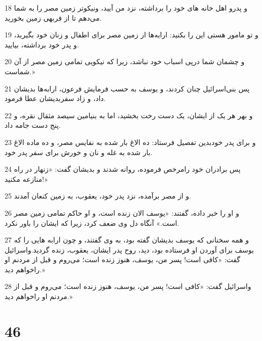 \par 18 و پدرو اهل خانه های خود را برداشته، نزد من آیید، ونیکوتر زمین مصر را به شما می‌دهم تا از فربهی زمین بخورید.
\par 19 و تو مامور هستی این را بکنید: ارابه‌ها از زمین مصر برای اطفال و زنان خود بگیرید، و پدر خود برداشته، بیایید.
\par 20 و چشمان شما در‌پی اسباب خود نباشد، زیرا که نیکویی تمامی زمین مصر از آن شماست.»
\par 21 پس بنی‌اسرائیل چنان کردند، و یوسف به حسب فرمایش فرعون، ارابه‌ها بدیشان داد، و زاد سفربدیشان عطا فرمود.
\par 22 و بهر هر یک از ایشان، یک دست رخت بخشید، اما به بنیامین سیصد مثقال نقره، و پنج دست جامه داد.
\par 23 و برای پدر خودبدین تفصیل فرستاد: ده الاغ بار شده به نفایس مصر، و ده ماده الاغ بار شده به غله و نان و خورش برای سفر پدر خود.
\par 24 پس برادران خود رامرخص فرموده، روانه شدند و بدیشان گفت: «زنهار در راه منازعه مکنید!»
\par 25 و از مصر برآمده، نزد پدر خود، یعقوب، به زمین کنعان آمدند.
\par 26 و او را خبر داده، گفتند: «یوسف الان زنده است، و او حاکم تمامی زمین مصر است.» آنگاه دل وی ضعف کرد، زیرا که ایشان را باور نکرد.
\par 27 و همه سخنانی که یوسف بدیشان گفته بود، به وی گفتند، و چون ارابه هایی را که یوسف برای آوردن او فرستاده بود، دید، روح پدر ایشان، یعقوب، زنده گردید.واسرائیل گفت: «کافی است! پسر من، یوسف، هنوز زنده است؛ می‌روم و قبل از مردنم او راخواهم دید.»
\par 28 واسرائیل گفت: «کافی است! پسر من، یوسف، هنوز زنده است؛ می‌روم و قبل از مردنم او راخواهم دید.»
 
\chapter{46}

